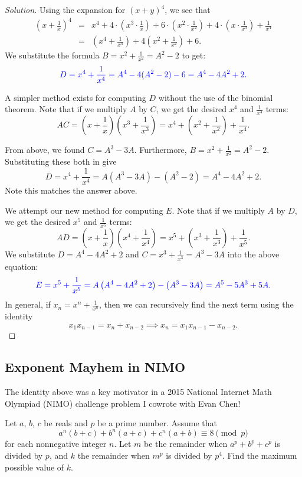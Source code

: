 \begin{proof}[Solution]
Using the expansion for $(x+y)^4$, we see that \begin{eqnarray*} (x+\frac{1}{x})^4&=&x^4+4\cdot \left(x^3\cdot \frac{1}{x}\right)+6\cdot \left(x^2\cdot \frac{1}{x^2}\right)+4\cdot \left(x\cdot \frac{1}{x^3}\right)+\frac{1}{x^4} \\ &=& \left(x^4+\frac{1}{x^4}\right)+4\left(x^2+\frac{1}{x^2}\right)+6. \end{eqnarray*}
We substitute the formula $B=x^2+\frac{1}{x^2}=A^2-2$ to get: $$\color{blue} D=x^4+\frac{1}{x^4}=A^4-4(A^2-2)-6=A^4-4A^2+2.$$ 

\clearpage

A simpler method exists for computing $D$ without the use of the binomial theorem. Note that if we multiply $A$ by $C$, we get the desired $x^4$ and $\frac{1}{x^4}$ terms: $$AC=\left(x+\frac{1}{x}\right)\left(x^3+\frac{1}{x^3}\right)=x^4+\left(x^2+\frac{1}{x^2}\right)+\frac{1}{x^4}.$$  

From above, we found $C=A^3-3A$. Furthermore, $B=x^2+\frac{1}{x^2}=A^2-2$. Substituting these both in give $$D=x^4+\frac{1}{x^4}=A(A^3-3A)-(A^2-2)=A^4-4A^2+2.$$ Note this matches the answer above.  

\clearpage

We attempt our new method for computing $E$. Note that if we multiply $A$ by $D$, we get the desired $x^5$ and $\frac{1}{x^5}$ terms: $$AD=\left(x+\frac{1}{x}\right)\left(x^4+\frac{1}{x^4}\right)=x^5+\left(x^3+\frac{1}{x^3}\right)+\frac{1}{x^5}.$$  
We substitute $D=A^4-4A^2+2$ and $C=x^3+\frac{1}{x^3}=A^3-3A$ into the above equation: $$\color{blue} E=x^5+\frac{1}{x^5}=A\left(A^4-4A^2+2\right)-\left(A^3-3A\right)=A^5-5A^3+5A.$$In general, if $x_n=x^n+\frac{1}{x^n}$, then we can recursively find the next term using the identity $$x_1x_{n-1}=x_n+x_{n-2}\implies x_n=x_1x_{n-1}-x_{n-2}.$$  \end{proof}

\clearpage


\subsection*{Exponent Mayhem in NIMO}

The identity above was a key motivator in a 2015 National Internet Math Olympiad (NIMO) challenge problem I cowrote with Evan Chen! 

\begin{prob}  Let $a$, $b$, $c$ be reals and $p$ be a prime number. Assume that \[ a^n(b+c)+b^n(a+c)+c^n(a+b)\equiv 8\pmod{p} \] for each nonnegative integer $n$. Let $m$ be the remainder when $a^p+b^p+c^p$ is divided by $p$, and $k$ the remainder when $m^p$ is divided by $p^4$. Find the maximum possible value of $k$. \end{prob}

